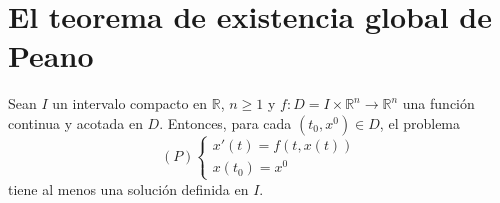 \section{El teorema de existencia global de Peano}
\begin{theorem}
    Sean $I$ un intervalo compacto en $\mathbb{R}$, $n \geq 1$ y $f: D = I \times \mathbb{R}^n \to \mathbb{R}^n$ una función continua y acotada en $D$.
    Entonces, para cada $(t_0, x^0) \in D$, el problema
    $$(P) \begin{cases}
            x'(t) = f(t, x(t)) \\
            x(t_0) = x^0
        \end{cases}$$
    tiene al menos una solución definida en $I$.
\end{theorem}